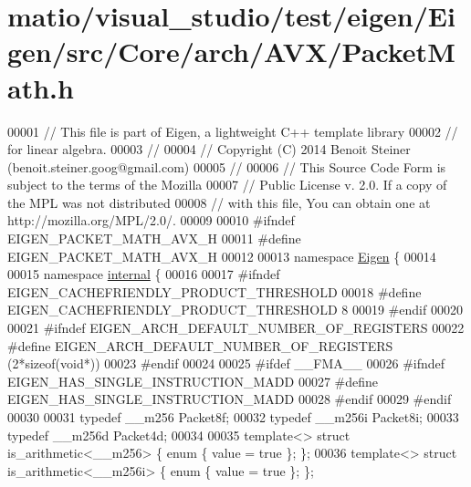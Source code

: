 \hypertarget{matio_2visual__studio_2test_2eigen_2_eigen_2src_2_core_2arch_2_a_v_x_2_packet_math_8h_source}{}\section{matio/visual\+\_\+studio/test/eigen/\+Eigen/src/\+Core/arch/\+A\+V\+X/\+Packet\+Math.h}
\label{matio_2visual__studio_2test_2eigen_2_eigen_2src_2_core_2arch_2_a_v_x_2_packet_math_8h_source}

\begin{DoxyCode}
00001 \textcolor{comment}{// This file is part of Eigen, a lightweight C++ template library}
00002 \textcolor{comment}{// for linear algebra.}
00003 \textcolor{comment}{//}
00004 \textcolor{comment}{// Copyright (C) 2014 Benoit Steiner (benoit.steiner.goog@gmail.com)}
00005 \textcolor{comment}{//}
00006 \textcolor{comment}{// This Source Code Form is subject to the terms of the Mozilla}
00007 \textcolor{comment}{// Public License v. 2.0. If a copy of the MPL was not distributed}
00008 \textcolor{comment}{// with this file, You can obtain one at http://mozilla.org/MPL/2.0/.}
00009 
00010 \textcolor{preprocessor}{#ifndef EIGEN\_PACKET\_MATH\_AVX\_H}
00011 \textcolor{preprocessor}{#define EIGEN\_PACKET\_MATH\_AVX\_H}
00012 
00013 \textcolor{keyword}{namespace }\hyperlink{namespace_eigen}{Eigen} \{
00014 
00015 \textcolor{keyword}{namespace }\hyperlink{namespaceinternal}{internal} \{
00016 
00017 \textcolor{preprocessor}{#ifndef EIGEN\_CACHEFRIENDLY\_PRODUCT\_THRESHOLD}
00018 \textcolor{preprocessor}{#define EIGEN\_CACHEFRIENDLY\_PRODUCT\_THRESHOLD 8}
00019 \textcolor{preprocessor}{#endif}
00020 
00021 \textcolor{preprocessor}{#ifndef EIGEN\_ARCH\_DEFAULT\_NUMBER\_OF\_REGISTERS}
00022 \textcolor{preprocessor}{#define EIGEN\_ARCH\_DEFAULT\_NUMBER\_OF\_REGISTERS (2*sizeof(void*))}
00023 \textcolor{preprocessor}{#endif}
00024 
00025 \textcolor{preprocessor}{#ifdef \_\_FMA\_\_}
00026 \textcolor{preprocessor}{#ifndef EIGEN\_HAS\_SINGLE\_INSTRUCTION\_MADD}
00027 \textcolor{preprocessor}{#define EIGEN\_HAS\_SINGLE\_INSTRUCTION\_MADD}
00028 \textcolor{preprocessor}{#endif}
00029 \textcolor{preprocessor}{#endif}
00030 
00031 \textcolor{keyword}{typedef} \_\_m256  Packet8f;
00032 \textcolor{keyword}{typedef} \_\_m256i Packet8i;
00033 \textcolor{keyword}{typedef} \_\_m256d Packet4d;
00034 
00035 \textcolor{keyword}{template}<> \textcolor{keyword}{struct }is\_arithmetic<\_\_m256>  \{ \textcolor{keyword}{enum} \{ value = \textcolor{keyword}{true} \}; \};
00036 \textcolor{keyword}{template}<> \textcolor{keyword}{struct }is\_arithmetic<\_\_m256i> \{ \textcolor{keyword}{enum} \{ value = \textcolor{keyword}{true} \}; \};

\end{DoxyCode}
